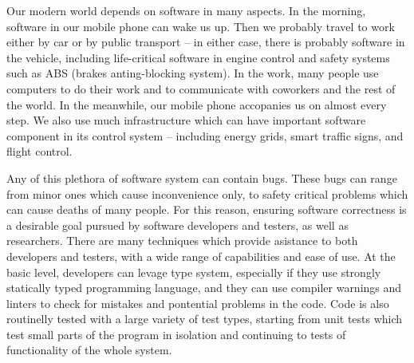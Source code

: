 Our modern world depends on software in many aspects.
In the morning, software in our mobile phone can wake us up.
Then we probably travel to work either by car or by public transport -- in either case, there is probably software in the vehicle, including life-critical software in engine control and safety systems such as ABS (brakes anting-blocking system).
In the work, many people use computers to do their work and to communicate with coworkers and the rest of the world.
In the meanwhile, our mobile phone accopanies us on almost every step.
We also use much infrastructure which can have important software component in its control system -- including energy grids, smart traffic signs, and flight control.

Any of this plethora of software system can contain bugs.
These bugs can range from minor ones which cause inconvenience only, to safety critical problems which can cause deaths of many people.
For this reason, ensuring software correctness is a desirable goal pursued by software developers and testers, as well as researchers.
There are many techniques which provide asistance to both developers and testers, with a wide range of capabilities and ease of use.
At the basic level, developers can levage type system, especially if they use strongly statically typed programming language, and they can use compiler warnings and linters  to check for mistakes and pontential problems in the code.
Code is also routinelly tested with a large variety of test types, starting from unit tests which test small parts of the program in isolation and continuing to tests of functionality of the whole system.

